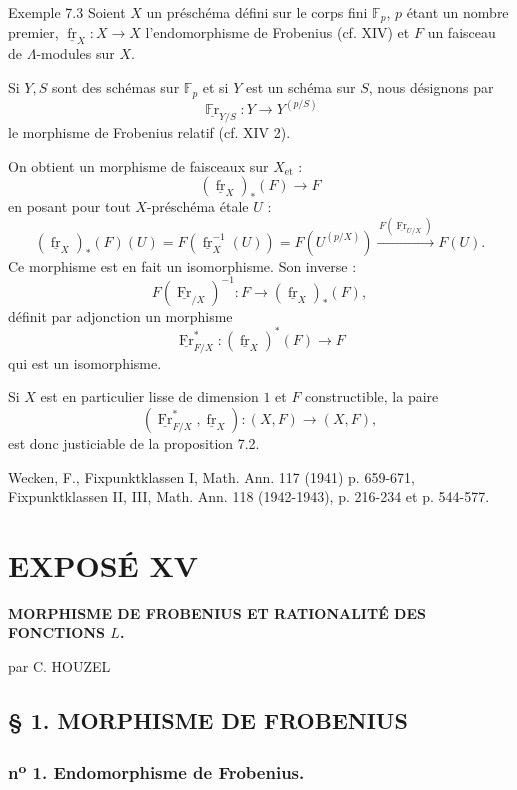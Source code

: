 \renewcommand{\fr}{\underline{\operatorname{fr}}}\renewcommand{\Fr}{\underline{\operatorname{Fr}}}
\begin{statement}{Exemple 7.3}
Soient $X$ un préschéma défini sur le corps fini $\mathbb{F}_p$, $p$ étant un nombre premier, $\fr_X:X\to X$ l'endomorphisme de Frobenius (cf. XIV) et $F$ un faisceau de $\Lambda$-modules sur $X$.

Si $Y,S$ sont des schémas sur $\mathbb{F}_p$ et si $Y$ est un schéma sur $S$, nous désignons par
\[
\underline{\operatorname{\mathbb{F}r}}_{Y/S}:Y\longrightarrow Y^{(p/S)}
\]
le morphisme de Frobenius relatif (cf. XIV 2).

On obtient un morphisme de faisceaux sur $X_{\mathrm{et}}$ :
\[
(\fr_X)_*(F)\longrightarrow F
\]
en posant pour tout $X$-préschéma étale $U$ :
\[
(\fr_X)_*(F)(U)=F(\fr_X^{-1}(U))=F(U^{(p/X)})
 \xrightarrow{\,F(\Fr_{U/X})\,}F(U).
\]
Ce morphisme est en fait un isomorphisme. Son inverse :
\[
F(\Fr_{/X})^{-1}:F\longrightarrow (\fr_X)_*(F),
\]
définit par adjonction un morphisme
\[
\Fr_{F/X}^*:(\fr_X)^*(F)\longrightarrow F
\]
qui est un isomorphisme.

Si $X$ est en particulier lisse de dimension $1$ et $F$ constructible, la paire
\[
(\Fr_{F/X}^*,\fr_X):(X,F)\longrightarrow (X,F),
\]
est donc justiciable de la proposition 7.2.
\end{statement}

\noindent[1] Wecken, F., Fixpunktklassen I, Math. Ann. 117 (1941) p. 659-671, Fixpunktklassen II, III, Math. Ann. 118 (1942-1943), p. 216-234 et p. 544-577.

\section*{EXPOSÉ XV}
\renewcommand{\fr}{\underline{\underline{\operatorname{fr}}}}\renewcommand{\Fr}{\underline{\underline{\operatorname{Fr}}}}
\begin{center}
\Large\bfseries
MORPHISME DE FROBENIUS ET RATIONALITÉ DES FONCTIONS $L$.

\medskip
par C. HOUZEL
\end{center}

\subsection*{§ 1. MORPHISME DE FROBENIUS}

\subsubsection*{n\textsuperscript{o} 1. Endomorphisme de Frobenius.}

